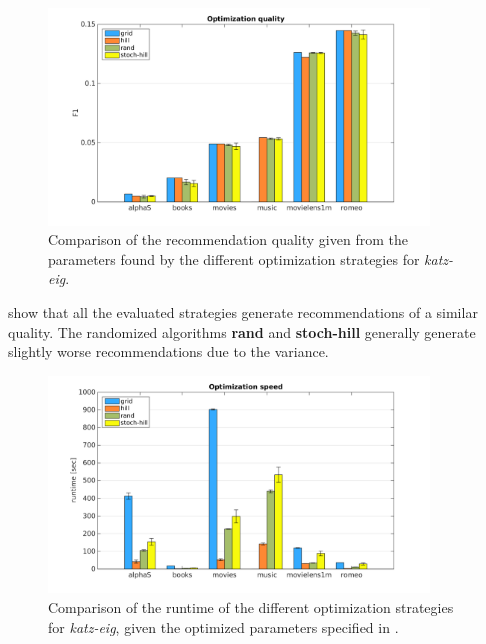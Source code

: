 \begin{figure}[h!]
    \centering
    \includegraphics[width=0.9\textwidth]{fig/comp/comp_katz_quality.png}
    \caption{Comparison of the recommendation quality given from the parameters found by the different optimization strategies for \textit{katz-eig}.}
    \label{fig:comp_katz_quality}
\end{figure}

\FloatBarrier

 show that all the evaluated strategies generate recommendations of a similar quality. The randomized algorithms \textbf{rand} and \textbf{stoch-hill} generally generate slightly worse recommendations due to the variance.

\begin{figure}[h!]
    \centering
    \includegraphics[width=0.9\textwidth]{fig/comp/comp_katz_speed.png}
    \caption{Comparison of the runtime of the different optimization strategies for \textit{katz-eig}, given the optimized parameters specified in .}
\end{figure}

